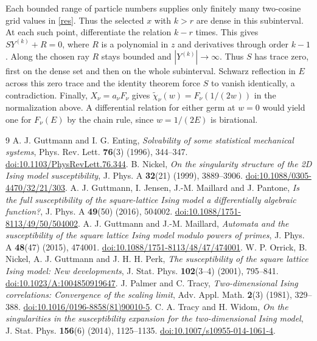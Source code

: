 \documentclass[11pt]{article}
\begin{document}
Each bounded range of particle numbers supplies only finitely many
two-cosine grid values in \eqref{res}. Thus the selected $x$ with
$k>r$ are dense in this subinterval. At each such point, differentiate the
relation $k-r$ times. This gives $S Y^{(k)}+R=0$, where $R$ is a
polynomial in $z$ and derivatives through order $k-1$. Along the
chosen ray $R$ stays bounded and $|Y^{(k)}|\to\infty$. Thus $S$
has trace zero, first on the dense set and then on the whole
subinterval. Schwarz reflection in $E$ across this zero trace and
the identity theorem force $S$ to vanish identically, a contradiction.
Finally, $X_\nu=a_\nu F_\nu$ gives
$\widetilde\chi_\nu(w)=F_\nu(1/(2w))$ in the normalization above.
A differential relation for either germ at $w=0$ would yield one
for $F_\nu(E)$ by the chain rule, since $w=1/(2E)$ is birational.

\begingroup\small
\begin{thebibliography}{9}
\setlength{\itemsep}{3pt}\setlength{\parsep}{0pt}
 A. J. Guttmann and I. G. Enting,
\emph{Solvability of some statistical mechanical systems},
Phys. Rev. Lett. \textbf{76}(3) (1996), 344--347.
\href{https://doi.org/10.1103/PhysRevLett.76.344}{doi:10.1103/PhysRevLett.76.344}.
 B. Nickel, \emph{On the singularity structure of the
2D Ising model susceptibility}, J. Phys. A \textbf{32}(21) (1999),
3889--3906. \href{https://doi.org/10.1088/0305-4470/32/21/303}{doi:10.1088/0305-4470/32/21/303}.
 A. J. Guttmann, I. Jensen, J.-M. Maillard and J. Pantone,
\emph{Is the full susceptibility of the square-lattice Ising model a
differentially algebraic function?}, J. Phys. A \textbf{49}(50) (2016),
504002. \href{https://doi.org/10.1088/1751-8113/49/50/504002}{doi:10.1088/1751-8113/49/50/504002}.
 A. J. Guttmann and J.-M. Maillard,
\emph{Automata and the susceptibility of the square lattice Ising model
modulo powers of primes}, J. Phys. A \textbf{48}(47) (2015), 474001.
\href{https://doi.org/10.1088/1751-8113/48/47/474001}{doi:10.1088/1751-8113/48/47/474001}.
 W. P. Orrick, B. Nickel, A. J. Guttmann and J. H. H. Perk,
\emph{The susceptibility of the square lattice Ising model: New developments},
J. Stat. Phys. \textbf{102}(3--4) (2001), 795--841.
\href{https://doi.org/10.1023/A:1004850919647}{doi:10.1023/A:1004850919647}.
 J. Palmer and C. Tracy, \emph{Two-dimensional Ising
correlations: Convergence of the scaling limit}, Adv. Appl. Math.
\textbf{2}(3) (1981), 329--388.
\href{https://doi.org/10.1016/0196-8858(81)90010-5}{doi:10.1016/0196-8858(81)90010-5}.
 C. A. Tracy and H. Widom, \emph{On the singularities in the
susceptibility expansion for the two-dimensional Ising model},
J. Stat. Phys. \textbf{156}(6) (2014), 1125--1135.
\href{https://doi.org/10.1007/s10955-014-1061-4}{doi:10.1007/s10955-014-1061-4}.
\end{thebibliography}
\endgroup
\end{document}
